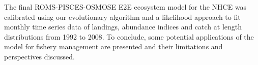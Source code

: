 The final ROMS-PISCES-OSMOSE E2E ecosystem model for the NHCE was calibrated using our evolutionary algorithm and a likelihood approach to fit monthly time series data of landings, abundance indices and catch at length distributions from 1992 to 2008. To conclude, some potential applications of the model for fishery management are presented and their limitations and perspectives discussed.
